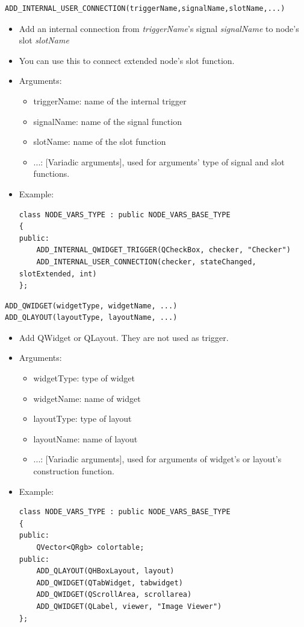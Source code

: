 \documentclass[a4paper,10pt]{book}
\begin{document}
\begin{mdframed}
\begin{verbatim}
ADD_INTERNAL_USER_CONNECTION(triggerName,signalName,slotName,...) 
\end{verbatim}
\begin{itemize}
 \item Add an internal connection from {\em{triggerName}}'s signal {\em{signalName}} to node's slot {\em{slotName}}
 \item You can use this to connect extended node's slot function.
 \item Arguments:
 \begin{itemize}
  \item triggerName: name of the internal trigger
  \item signalName: name of the signal function
  \item slotName: name of the slot function
  \item ...: [Variadic arguments], used for arguments' type of signal and slot functions. 
 \end{itemize}
 \item Example:
 \begin{verbatim}
class NODE_VARS_TYPE : public NODE_VARS_BASE_TYPE
{
public:
    ADD_INTERNAL_QWIDGET_TRIGGER(QCheckBox, checker, "Checker")
    ADD_INTERNAL_USER_CONNECTION(checker, stateChanged, slotExtended, int)
};
 \end{verbatim}
\end{itemize}
\end{mdframed}

\begin{mdframed}
\begin{verbatim}
ADD_QWIDGET(widgetType, widgetName, ...)
ADD_QLAYOUT(layoutType, layoutName, ...)
\end{verbatim}
\begin{itemize}
 \item Add QWidget or QLayout. They are not used as trigger.
 \item Arguments:
 \begin{itemize}
  \item widgetType: type of widget
  \item widgetName: name of widget
  \item layoutType: type of layout
  \item layoutName: name of layout
  \item ...: [Variadic arguments], used for arguments of widget's or layout's construction function. 
 \end{itemize}
 \item Example:
\begin{verbatim}
class NODE_VARS_TYPE : public NODE_VARS_BASE_TYPE
{
public:
    QVector<QRgb> colortable;
public:
    ADD_QLAYOUT(QHBoxLayout, layout)
    ADD_QWIDGET(QTabWidget, tabwidget)
    ADD_QWIDGET(QScrollArea, scrollarea)
    ADD_QWIDGET(QLabel, viewer, "Image Viewer")
};
\end{verbatim}
\end{itemize}
\end{mdframed}
\end{document}
